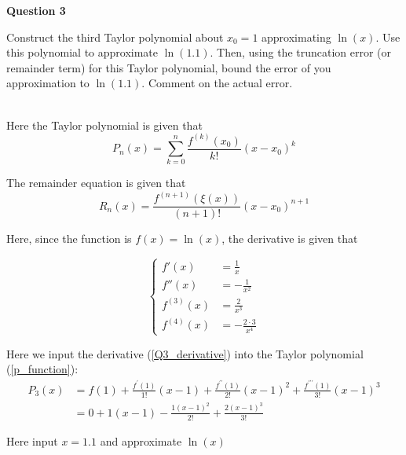 

\begin{tcolorbox}
\textbf{Question 3} 

Construct the third Taylor polynomial about $x_{0}=1$ approximating $\ln (x)$. Use this polynomial to approximate $\ln (1.1)$. Then, using the truncation error (or remainder term) for this Taylor polynomial, bound the error of you approximation to $\ln (1.1)$. Comment on the actual error.

\end{tcolorbox}

\begin{solution}\ \\

Here the Taylor polynomial is given that
\begin{equation}
P_{n}(x) = \sum_{k=0}^{n} \frac{f^{(k)}\left(x_{0}\right)}{k !}\left(x-x_{0}\right)^{k} \label{p_function}
\end{equation}

The remainder equation is given that
\begin{equation}
R_{n}(x)=\frac{f^{(n+1)}(\xi(x))}{(n+1) !}\left(x-x_{0}\right)^{n+1} \label{r_function}
\end{equation}

Here, since the function is $f(x)=\ln(x)$, the derivative is given that

\begin{equation}
	\left \{
		\begin{aligned}
			f'(x)&= \frac{1}{x}\\
			f''(x)&=-\frac{1}{x^2}\\
			f^{(3)}(x)&=\frac{2}{x^3}\\
			f^{(4)}(x)&=-\frac{2 \cdot 3}{x^4}
		\end{aligned}
	\right. \label{Q3_derivative}
\end{equation}

Here we input the derivative (\ref{Q3_derivative}) into the Taylor polynomial (\ref{p_function}): 
\begin{equation*}
\begin{aligned}
P_{3}(x) &=f(1)+\frac{f^{\prime}(1)}{1 !}(x-1)+\frac{f^{\prime \prime}(1)}{2 !}(x-1)^{2}+\frac{f^{\prime \prime \prime}(1)}{3 !}(x-1)^{3} \\
& = 0+1(x-1)-\frac{1(x-1)^{2}}{2 !}+\frac{2(x-1)^{3}}{3 !}
\end{aligned}
\end{equation*}

Here input $x=1.1$ and approximate $\ln(x)$


\end{solution}
